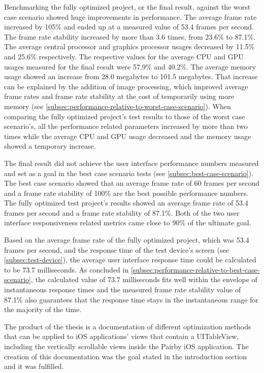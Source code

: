 \documentclass[a4paper,12pt]{article}
\begin{document}
Benchmarking the fully optimized project, or the final result, against the worst case scenario showed huge improvements in performance. The average frame rate increased by 105\% and ended up at a measured value of 53.4 frames per second. The frame rate stability increased by more than 3.6 times, from 23.6\% to 87.1\%. The average central processor and graphics processor usages decreased by 11.5\% and 25.6\% respectively. The respective values for the average CPU and GPU usages measured for the final result were 57.9\% and 40.2\%. The average memory usage showed an increase from 28.0 megabytes to 101.5 megabytes. That increase can be explained by the addition of image processing, which improved average frame rates and frame rate stability at the cost of temporarily using more memory (see \autoref{subsec:performance-relative-to-worst-case-scenario}). When comparing the fully optimized project's test results to those of the worst case scenario's, all the performance related parameters increased by more than two times while the average CPU and GPU usage decreased and the memory usage showed a temporary increase.

The final result did not achieve the user interface performance numbers measured and set as a goal in the best case scenario tests (see \autoref{subsec:best-case-scenario}). The best case scenario showed that an average frame rate of 60 frames per second and a frame rate stability of 100\% are the best possible performance numbers. The fully optimized test project's results showed an average frame rate of 53.4 frames per second and a frame rate stability of 87.1\%. Both of the two user interface responsiveness related metrics came close to 90\% of the ultimate goal.

Based on the average frame rate of the fully optimized project, which was 53.4 frames per second, and the response time of the test device's screen (see \autoref{subsec:test-device}), the average user interface response time could be calculated to be 73.7 milliseconds. As concluded in \autoref{subsec:performance-relative-to-best-case-scenario}, the calculated value of 73.7 milliseconds fits well within the envelope of instantaneous response times and the measured frame rate stability value of 87.1\% also guarantees that the response time stays in the instantaneous range for the majority of the time.

The product of the thesis is a documentation of different optimization methods that can be applied to iOS applications' views that contain a UITableView, including the vertically scrollable views inside the Pairby iOS application. The creation of this documentation was the goal stated in the introduction section and it was fulfilled.


\newpage
{}
{}
\listoffigures

\newpage
{}
{}


\end{document}
